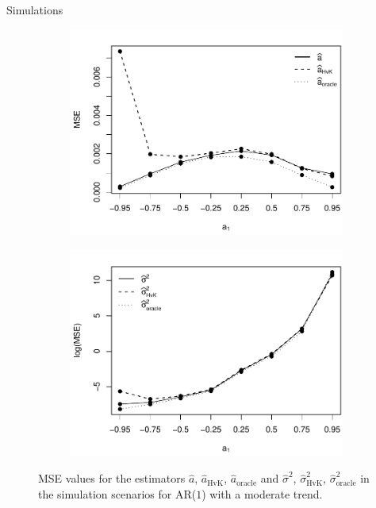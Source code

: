 \documentclass[10pt]{beamer}
\begin{document}
\begin{frame}{Simulations}
\begin{figure}[t!]
\begin{subfigure}[b]{0.475\textwidth}
\includegraphics[width=\textwidth]{MSE_a1_T=500_slope=1_(q,r,M1,M2)=(25,10,20,30).pdf}
\end{subfigure}\hspace{0.25cm}
\begin{subfigure}[b]{0.475\textwidth}
\includegraphics[width=\textwidth]{MSE_lrv_T=500_slope=1_(q,r,M1,M2)=(25,10,20,30).pdf}
\end{subfigure}
\caption{MSE values for the estimators $\widehat{a}$, $\widehat{a}_{\text{HvK}}$, $\widehat{a}_{\text{oracle}}$ and $\widehat{\sigma}^2$, $\widehat{\sigma}^2_{\text{HvK}}$, $\widehat{\sigma}^2_{\text{oracle}}$ in the simulation scenarios for AR($1$) with a moderate trend. %
}\label{fig:MSE_slope1}
\end{figure}
\end{frame}
\end{document}
